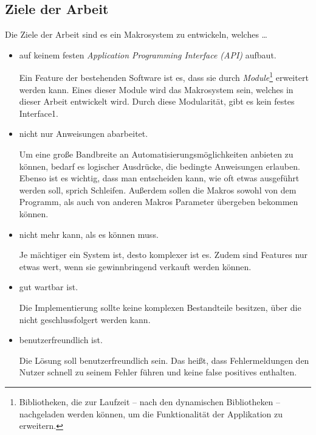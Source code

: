   \subsection{Ziele der Arbeit}
  \label{ssec:Ziele der Arbeit}
    Die Ziele der Arbeit sind es ein Makrosystem zu entwickeln, welches \ldots
    \begin{itemize}
      \item auf keinem festen \emph{Application Programming Interface (API)} aufbaut.

        Ein Feature der bestehenden Software ist es, dass sie durch \emph{Module}\footnote{
          Bibliotheken, die zur Laufzeit -- nach den dynamischen Bibliotheken --  nachgeladen werden können, um die Funktionalität der Applikation zu erweitern.
        } erweitert werden kann. Eines dieser Module wird das Makrosystem sein, welches in dieser Arbeit entwickelt wird. Durch diese Modularität, gibt es kein festes Interface1.

      \item nicht nur Anweisungen abarbeitet.

        Um eine große Bandbreite an Automatisierungsmöglichkeiten anbieten zu können, bedarf es logischer Ausdrücke, die bedingte Anweisungen erlauben. Ebenso ist es wichtig, dass man entscheiden kann, wie oft etwas ausgeführt werden soll, sprich Schleifen. Außerdem sollen die Makros sowohl von dem Programm, als auch von anderen Makros Parameter übergeben bekommen können.

      \item nicht mehr kann, als es können muss.

        Je mächtiger ein System ist, desto komplexer ist es. Zudem sind Features nur etwas wert, wenn sie gewinnbringend verkauft werden können.

      \item gut wartbar ist.

        Die Implementierung sollte keine komplexen Bestandteile besitzen, über die nicht geschlussfolgert werden kann.

      \item benutzerfreundlich ist.

        Die Lösung soll benutzerfreundlich sein. Das heißt, dass Fehlermeldungen den Nutzer schnell zu seinem Fehler führen und keine false positives enthalten.
    \end{itemize}

